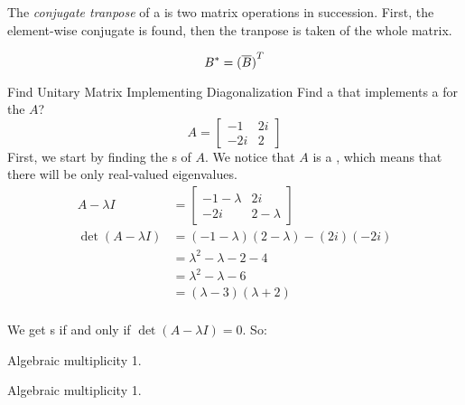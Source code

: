 \begin{definition}\label{def:Conjugate_Transpose}
  The \emph{conjugate tranpose} of a  is two matrix operations in succession.
  First, the element-wise conjugate is found, then the tranpose is taken of the whole matrix.

  \begin{equation}\label{eq:Conjugate_Tranpose}
    B^{*} = {(\overline{B})}^{T}
  \end{equation}
\end{definition}

\begin{example}{Find Unitary Matrix Implementing Diagonalization}
  Find a  that implements a  for the  $A$?
  \begin{equation*}
    A =
    \begin{bmatrix}
      -1 & 2i \\
      -2i & 2
    \end{bmatrix}
  \end{equation*}
  \tcblower{}
  First, we start by finding the s of $A$.
  We notice that $A$ is a , which means that there will be only real-valued eigenvalues.
  \begin{align*}
    A - \lambda I &=
                    \begin{bmatrix}
                      -1 - \lambda & 2i \\
                      -2i & 2 - \lambda
                    \end{bmatrix} \\
    \det(A - \lambda I) &= (-1 - \lambda) (2 - \lambda) - (2i) (-2i) \\
                  &= \lambda^{2} - \lambda - 2 - 4 \\
                  &= \lambda^{2} - \lambda - 6 \\
                  &= (\lambda - 3) (\lambda + 2) \\
  \end{align*}

  We get s if and only if $\det(A - \lambda I) = 0$.
  So:
  \begin{description}[noitemsep]
  \item[$\lambda = 3$] Algebraic multiplicity 1.
  \item[$\lambda = -2$] Algebraic multiplicity 1.
  \end{description}


\end{example}
